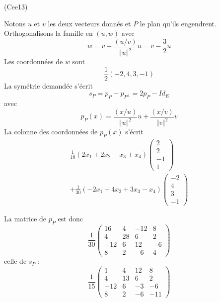 \begin{tiny}(Cee13)\end{tiny} Notons $u$ et $v$ les deux vecteurs donnés et $P$ le plan qu'ils engendrent. Orthogonalisons la famille en $(u,w)$ avec
\begin{displaymath}
 w = v-\frac{(u/v)}{\Vert u \Vert^2}u = v-\frac{3}{2}u
\end{displaymath}
Les coordonnées de $w$ sont
\begin{displaymath}
 \frac{1}{2}(-2,4,3,-1)
\end{displaymath}
La symétrie demandée s'écrit
\begin{displaymath}
 s_P = p_P - p_{P^{\perp}} = 2p_P -Id_E
\end{displaymath}
avec
\begin{displaymath}
 p_P(x) = \frac{(x/u)}{\Vert u\Vert^2} u + \frac{(x/v)}{\Vert v\Vert^2} v
\end{displaymath}
La colonne des coordonnées de $p_P(x)$ s'écrit
\begin{multline*}
 \frac{1}{10}(2x_1 + 2x_2 -x_3 + x_4)
\begin{pmatrix}
 2 \\ 2 \\ -1 \\1
\end{pmatrix} \\
+ \frac{1}{30}(-2x_1 + 4x_2 +3x_3 - x_4)
\begin{pmatrix}
 -2 \\ 4 \\ 3 \\ -1
\end{pmatrix}
\end{multline*}

La matrice de $p_P$ est donc
\begin{displaymath}
\frac{1}{30}
 \begin{pmatrix}
  16 & 4 & -12 & 8 \\
  4 & 28 & 6   & 2 \\
 -12 & 6  & 12 & -6 \\
  8 & 2  & -6  & 4 
 \end{pmatrix}
\end{displaymath}
celle de $s_P$ :
\begin{displaymath}
\frac{1}{15}
 \begin{pmatrix}
  1 & 4  & 12 & 8 \\
  4 & 13 & 6  & 2 \\
 -12 & 6 & -3 & -6 \\
  8 & 2  & -6 & -11 
 \end{pmatrix}
\end{displaymath}
